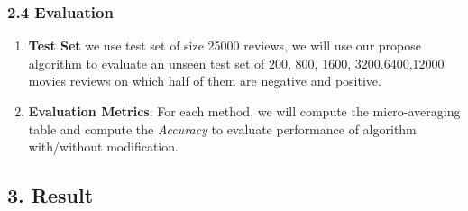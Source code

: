 \documentclass[]{article}
\begin{document}
\subsubsection{2.4 Evaluation}
\begin{enumerate}
	\item \textbf{Test Set} we use test set of size 25000 reviews, we will use our propose algorithm to evaluate an unseen test set of $200$, $800$, $1600$, $3200$.$6400$,$12000$ movies reviews on which half of them are negative and positive.
	\item \textbf{Evaluation Metrics}: For each method, we will compute the micro-averaging table and compute the \textit{Accuracy} to evaluate performance of algorithm with/without modification.
\end{enumerate}
\subsection{3. Result}\label{Result}
\end{document}
